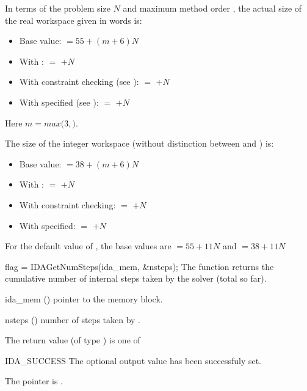 {
  In terms of the problem size $N$ and maximum method order ,
  the actual size of the real workspace given in  words is:
  \begin{itemize}
  \item Base value:  $=55 + (m+6) N$
  \item With :  $=$  $+ N$
  \item With constraint checking (see ): 
     $=$  $+ N$
  \item With  specified (see ): 
     $=$  $+ N$
  \end{itemize}
  Here $m = max(3,$$)$.

  The size of the integer workspace (without distinction between  
  and ) is:
  \begin{itemize}
  \item Base value:  $=38 + (m+6) N$
  \item With :  $=$  $+ N$ 
  \item With constraint checking:  $=$  $+ N$
  \item With  specified:  $=$  $+ N$
  \end{itemize}

  For the default value of , the base values are
   $=55 + 11N$ and  $=38 + 11N$ 
}
{
  flag = IDAGetNumSteps(ida\_mem, \&nsteps);
}
{
  The function  returns the cumulative number of internal 
  steps taken by the solver (total so far).
}
{
  \begin{args}
  \item[ida\_mem] ()
    pointer to the {\ida} memory block.
  \item[nsteps] ()
    number of steps taken by {\ida}.
  \end{args}
}
{
  The return value  (of type ) is one of
  \begin{args}
  \item[IDA\_SUCCESS] 
    The optional output value has been successfuly set.
  \item[\Id{IDA\_MEM\_NULL}]
    The  pointer is .
  \end{args}
}
{}
